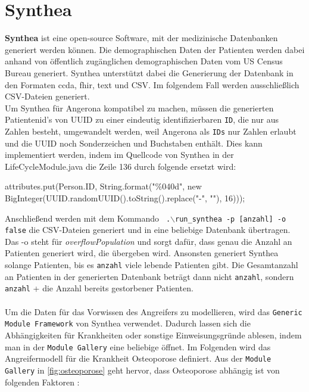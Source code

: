 \documentclass[german,version-2020-11]{uzl-thesis}
\begin{document}
\section{Synthea}
\textbf{Synthea} \cite{19,20} ist eine open-source Software, mit der medizinische Datenbanken generiert werden können. Die demographischen Daten der Patienten werden dabei anhand von öffentlich zugänglichen demographischen Daten vom US Census Bureau \cite{21} generiert. Synthea unterstützt dabei die Generierung der Datenbank in den Formaten ccda, fhir, text und CSV. Im folgendem Fall werden ausschließlich CSV-Dateien generiert.\\  Um Synthea für Angerona kompatibel zu machen, müssen die generierten Patientenid's von UUID zu einer eindeutig identifizierbaren \texttt{ID}, die nur aus Zahlen besteht, umgewandelt werden, weil Angerona als \texttt{IDs} nur Zahlen erlaubt und die UUID noch Sonderzeichen und Buchstaben enthält. Dies kann implementiert werden, indem im Quellcode von Synthea in der LifeCycleModule.java die Zeile 136 durch folgende ersetzt wird: 
\begin{Java}
    attributes.put(Person.ID, String.format("\%040d", new BigInteger(UUID.randomUUID().toString().replace("-", ""), 16)));
\end{Java}
Anschließend werden mit dem Kommando \texttt{ .$\backslash$run\_synthea -p [anzahl] -o false} die CSV-Dateien generiert und in eine beliebige Datenbank übertragen. Das -o steht für \textit{\textit{overflowPopulation}} und sorgt dafür, dass genau die Anzahl an Patienten generiert wird, die übergeben wird. Ansonsten generiert Synthea solange Patienten, bis es \texttt{anzahl} viele lebende Patienten gibt. Die Gesamtanzahl an Patienten in der generierten Datenbank beträgt dann nicht \texttt{anzahl}, sondern \texttt{anzahl} + die Anzahl bereits gestorbener Patienten. \\ \\
Um die Daten für das Vorwissen des Angreifers zu modellieren, wird das \texttt{Generic Module Framework} von Synthea verwendet. Dadurch lassen sich die Abhängigkeiten für Krankheiten oder sonstige  Einweisungsgründe ablesen, indem man in der \texttt{Module Gallery} \cite{25} eine beliebige öffnet. Im Folgenden  wird das Angreifermodell für die Krankheit Osteoporose definiert. 
Aus der \texttt{Module Gallery} in \autoref{fig:osteoporose} geht hervor, dass Osteoporose abhängig ist von folgenden Faktoren : 
\end{document}
